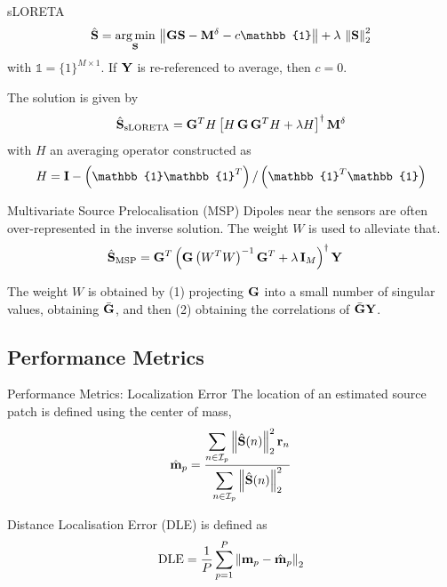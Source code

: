 \documentclass[progressbar=head]{beamer}
\begin{document}
\begin{frame}{sLORETA}
\begin{equation}
    \hat{\mathbf{S}} = \argmin_{\mathbf{S}}\, \nnorm{\G \mathbf{S}-\mathbf{M}^\delta-c \mathbb{1}} + \lambda\, \nnorm{\mathbf{S}}_2^2
\end{equation}
with $\mathbb{1}=\{1\}^{M\times 1}$.
If $\mathbf{Y}$ is re-referenced to average, then $c=0$.


The solution is given by
\begin{equation}
    \hat{\mathbf{S}}_{\text{sLORETA}}
    =
    \mathbf{G}^T H\left[ H\, \mathbf{G}\, \mathbf{G}^T H+ \lambda H \right]^{\dagger}
    \mathbf{M}^\delta
\end{equation}
with $H$ an averaging operator constructed as
\begin{equation*}
    H = \id - \ppar{\mathbb{1} \mathbb{1}^T}/\ppar{\mathbb{1}^T \mathbb{1}}
\end{equation*}

\end{frame}

\begin{frame}{Multivariate Source Prelocalisation (MSP)}
Dipoles near the sensors are often over-represented in the inverse solution. The weight $W$ is used to alleviate that.
\begin{align}
\hat{\mathbf{S}}_\text{MSP} 
&=
\mathbf{G}^T
\left( \mathbf{G} \left( W^T W \right)^{-1} \mathbf{G}^T + \lambda\, \mathbf{I}_M \right)^\dagger \mathbf{Y}
\end{align}

The weight $W$ is obtained by (1) projecting $\mathbf{G}$ into a small number of singular values, obtaining $\bar{\mathbf{G}}$, and then (2) obtaining the correlations of $\bar{\mathbf{G}} \mathbf{Y}$.
\end{frame}


\subsection{Performance Metrics}

\begin{frame}{Performance Metrics: Localization Error}
The location of an estimated source patch is defined using the center of mass,
\begin{equation}
    \hat{\mathbf{m}}_p = 
\frac{\displaystyle \sum_{n\in \mathcal{I}_p} \left\lVert \hat{\mathbf{S}}(n) \right\rVert_2^2 \mathbf{r}_n }{\displaystyle \sum_{n\in \mathcal{I}_p} \left\lVert \hat{\mathbf{S}}(n) \right\rVert_2^2}
\end{equation}

Distance Localisation Error (DLE) is defined as
\begin{equation}
\text{DLE} = 
\frac{1}{P} \sum_{p=1}^P \left\lVert  \mathbf{m}_p - \hat{\mathbf{m}}_p  \right\rVert_2
\label{def:DLE}
\end{equation}
\end{frame}
\end{document}
